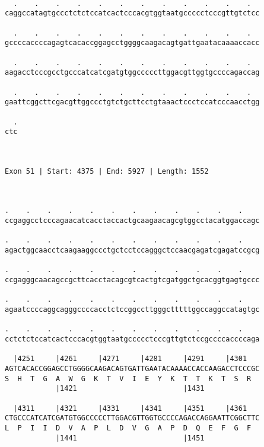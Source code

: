 \documentclass{article}
\begin{document}
\begin{Verbatim}
  
  .    .    .    .    .    .    .    .    .    .    .    .  
caggccatagtgccctctctccatcactcccacgtggtaatgccccctcccgttgtctcc
                                                            
  .    .    .    .    .    .    .    .    .    .    .    .  
gccccaccccagagtcacaccggagcctggggcaagacagtgattgaatacaaaaccacc
                                                            
  .    .    .    .    .    .    .    .    .    .    .    .  
aagacctcccgcctgcccatcatcgatgtggcccccttggacgttggtgccccagaccag
                                                            
  .    .    .    .    .    .    .    .    .    .    .    .  
gaattcggcttcgacgttggccctgtctgcttcctgtaaactccctccatcccaacctgg
                                                            
  .
ctc
   
   
 
Exon 51 | Start: 4375 | End: 5927 | Length: 1552



.    .    .    .    .    .    .    .    .    .    .    .    
ccgaggcctcccagaacatcacctaccactgcaagaacagcgtggcctacatggaccagc
                                                            
.    .    .    .    .    .    .    .    .    .    .    .    
agactggcaacctcaagaaggccctgctcctccagggctccaacgagatcgagatccgcg
                                                            
.    .    .    .    .    .    .    .    .    .    .    .    
ccgagggcaacagccgcttcacctacagcgtcactgtcgatggctgcacggtgagtgccc
                                                            
.    .    .    .    .    .    .    .    .    .    .    .    
agaatccccaggcagggccccacctctccggccttgggctttttggccaggccatagtgc
                                                            
.    .    .    .    .    .    .    .    .    .    .    .    
cctctctccatcactcccacgtggtaatgccccctcccgttgtctccgccccaccccaga
                                                            
  |4251     |4261     |4271     |4281     |4291     |4301   
AGTCACACCGGAGCCTGGGGCAAGACAGTGATTGAATACAAAACCACCAAGACCTCCCGC
S  H  T  G  A  W  G  K  T  V  I  E  Y  K  T  T  K  T  S  R  
            |1421                         |1431             
  
  |4311     |4321     |4331     |4341     |4351     |4361   
CTGCCCATCATCGATGTGGCCCCCTTGGACGTTGGTGCCCCAGACCAGGAATTCGGCTTC
L  P  I  I  D  V  A  P  L  D  V  G  A  P  D  Q  E  F  G  F  
            |1441                         |1451             
  

\end{Verbatim}
\end{document}
